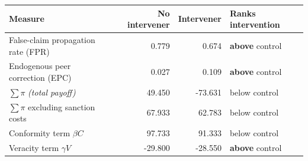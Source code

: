\begin{tabular}{lrrl}
\toprule
Measure & No intervener & Intervener & Ranks intervention \\
\midrule
False-claim propagation rate (FPR) & 0.779 & 0.674 & \textbf{above} control \\
Endogenous peer correction (EPC) & 0.027 & 0.109 & \textbf{above} control \\
\midrule
$\sum \pi$ \emph{(total payoff)} & 49.450 & -73.631 & below control \\
$\sum \pi$ excluding sanction costs & 67.933 & 62.783 & below control \\
Conformity term $\beta C$ & 97.733 & 91.333 & below control \\
Veracity term $\gamma V$ & -29.800 & -28.550 & \textbf{above} control \\
\bottomrule
\end{tabular}
